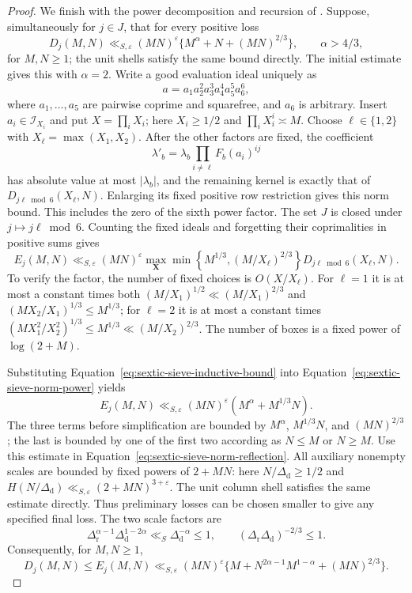 \documentclass[11pt,a4paper]{article}
\numberwithin{equation}{section}
\numberwithin{figure}{section}
\theoremstyle{definition}
\theoremstyle{remark}
\begin{document}
\begin{proof}
We finish with the power decomposition and recursion of
\cite[Lemmas~3.4--3.5]{BGL}.  Suppose, simultaneously for $j\in J$, that
for every positive loss
\begin{equation}\label{eq:sextic-sieve-inductive-bound}
 D_j(M,N)\ll_{S,\varepsilon}(MN)^\varepsilon
       \{M^\alpha+N+(MN)^{2/3}\},\qquad \alpha>4/3,
\end{equation}
for $M,N\ge1$; the unit shells satisfy the same bound directly.  The
initial estimate gives this with $\alpha=2$.  Write a good evaluation ideal
uniquely as
\[
 a=a_1a_2^2a_3^3a_4^4a_5^5a_6^6,
\]
where $a_1,\ldots,a_5$ are pairwise coprime and squarefree, and $a_6$ is
arbitrary.  Insert
$a_i\in\mathcal I_{X_i}$ and put $X=\prod_iX_i$; here $X_i\ge1/2$ and
$\prod_iX_i^i\asymp M$.  Choose $\ell\in\{1,2\}$ with
$X_\ell=\max(X_1,X_2)$.  After the other factors are fixed, the coefficient
\[
 \lambda'_b=\lambda_b\prod_{i\ne\ell}F_b(a_i)^{ij}
\]
has absolute value at most $|\lambda_b|$, and the remaining kernel is
exactly that of $D_{j\ell\bmod6}(X_\ell,N)$.  Enlarging its fixed positive
row restriction gives this norm bound.  This includes the zero of the
sixth power factor.  The set $J$ is closed under $j\mapsto j\ell\bmod6$.
Counting the fixed ideals and forgetting their coprimalities in positive
sums gives
\begin{equation}\label{eq:sextic-sieve-norm-power}
 E_j(M,N)\ll_{S,\varepsilon}(MN)^\varepsilon
 \max_{\boldsymbol X}
 \min\left\{M^{1/3},(M/X_\ell)^{2/3}\right\}
             D_{j\ell\bmod6}(X_\ell,N).
\end{equation}
To verify the factor, the number of fixed choices is $O(X/X_\ell)$.
For $\ell=1$ it is at most a constant times both
$(M/X_1)^{1/2}\ll(M/X_1)^{2/3}$ and
$(MX_2/X_1)^{1/3}\le M^{1/3}$; for $\ell=2$ it is at most a constant
times $(MX_1^2/X_2^2)^{1/3}\le M^{1/3}\ll(M/X_2)^{2/3}$.
The number of boxes is a fixed power of $\log(2+M)$.

Substituting Equation~\eqref{eq:sextic-sieve-inductive-bound} into
Equation~\eqref{eq:sextic-sieve-norm-power} yields
\[
 E_j(M,N)\ll_{S,\varepsilon}(MN)^\varepsilon
                    (M^\alpha+M^{1/3}N).
\]
The three terms before simplification are bounded by $M^\alpha$,
$M^{1/3}N$, and $(MN)^{2/3}$; the last is bounded by one of the first two
according as $N\le M$ or $N\ge M$.  Use this estimate in
Equation~\eqref{eq:sextic-sieve-norm-reflection}.  All auxiliary nonempty
scales are bounded by fixed powers of $2+MN$: here $N/\Delta_{\mathrm d}\ge1/2$ and
$H(N/\Delta_{\mathrm d})\ll_{S,\varepsilon}(2+MN)^{3+\varepsilon}$.
The unit column shell satisfies the same estimate directly.  Thus
preliminary losses can be chosen smaller to give any specified final loss.
The two scale factors are
\[
 \Delta_{\mathrm r}^{\alpha-1}\Delta_{\mathrm d}^{1-2\alpha}
       \ll_S\Delta_{\mathrm d}^{-\alpha}\le1,
 \qquad (\Delta_{\mathrm r}\Delta_{\mathrm d})^{-2/3}\le1.
\]
Consequently, for $M,N\ge1$,
\begin{equation}\label{eq:sextic-sieve-norm-recurrence}
 D_j(M,N)\le E_j(M,N)\ll_{S,\varepsilon}(MN)^\varepsilon
       \{M+N^{2\alpha-1}M^{1-\alpha}+(MN)^{2/3}\}.
\end{equation}


\end{proof}
\end{document}
